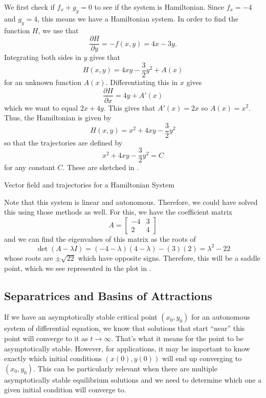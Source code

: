\documentclass{ximera}
\begin{document}
\begin{exampleSol}
We first check if $f_x + g_y = 0$ to see if the system is Hamiltonian. Since $f_x = -4$ and $g_y = 4$, this means we have a Hamiltonian system. In order to find the function $H$, we use that
\[ 
    \frac{\partial H}{\partial y} = -f(x,y) = 4x - 3y. 
\]
Integrating both sides in $y$ gives that
\[ 
    H(x,y) = 4xy - \frac{3}{2}y^2 + A(x) 
\] 
for an unknown function $A(x)$. Differentiating this in $x$ gives 
\[ 
    \frac{\partial H}{\partial x} = 4y + A'(x) 
\] 
which we want to equal $2x + 4y$. This gives that $A'(x) = 2x$ so $A(x) = x^2$. Thus, the Hamiltonian is given by
\[ 
    H(x,y) = x^2 + 4xy - \frac{3}{2}y^2 
\] 
so that the trajectories are defined by 
\[ 
    x^2 + 4xy - \frac{3}{2}y^2 = C
\] 
for any constant $C$. These are sketched in .

\begin{myfig}
    \capstart
    \caption{Vector field and trajectories for a Hamiltonian System \label{fig:HamilPlot}}
\end{myfig}

Note that this system is linear and autonomous. Therefore, we could have solved this using those methods as well. For this, we have the coefficient matrix 
\begin{equation*}
    A = 
    \begin{bmatrix} 
        -4 & 3 \\ 
        2 & 4 
    \end{bmatrix}
\end{equation*}
and we can find the eigenvalues of this matrix as the roots of
\begin{equation*}
    \det(A - \lambda I) = (-4-\lambda)(4-\lambda) - (3)(2)  = \lambda^2 - 22
\end{equation*}
whose roots are $\pm\sqrt{22}$ which have opposite signs. Therefore, this will be a saddle point, which we see represented in the plot in .
\end{exampleSol}


\subsection{Separatrices and Basins of Attractions}

If we have an asymptotically stable critical point $(x_0, y_0)$ for an autonomous system of differential equation, we know that solutions that start ``near'' this point will converge to it as $t \rightarrow \infty$. That's what it means for the point to be asymptotically stable. However, for applications, it may be important to know exactly which initial conditions $(x(0), y(0))$ will end up converging to $(x_0, y_0)$. This can be particularly relevant when there are multiple asymptotically stable equilibrium solutions and we need to determine which one a given initial condition will converge to. 
\end{document}
